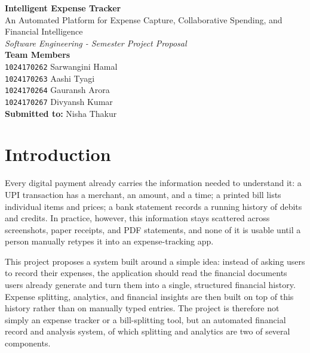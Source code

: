 \documentclass[11pt,a4paper]{article}
\begin{document}

\begin{center}

    {\huge\bfseries
    Intelligent Expense Tracker}\\[0.5em]

    {\large
    An Automated Platform for Expense Capture, Collaborative Spending,
    and Financial Intelligence}
    \\[0.9em]

    {\normalsize\itshape
    Software Engineering - Semester Project Proposal}\\[0.8em]

    {\small\bfseries Team Members}\\[0.3em]

    {\small
    \texttt{1024170262} Sarwangini Hamal\\
    \texttt{1024170263} Aashi Tyagi\\
    \texttt{1024170264} Gauransh Arora\\
    \texttt{1024170267} Divyansh Kumar%
    }\\[0.5em]

    {\small\textbf{Submitted to:} Nisha Thakur}

\end{center}

\vspace{0.8em}


\section{Introduction}

Every digital payment already carries the information needed to
understand it: a UPI transaction has a merchant, an amount, and a time;
a printed bill lists individual items and prices; a bank statement
records a running history of debits and credits. In practice, however,
this information stays scattered across screenshots, paper receipts, and
PDF statements, and none of it is usable until a person manually
retypes it into an expense-tracking app.

This project proposes a system built around a simple idea: instead of
asking users to record their expenses, the application should read the
financial documents users already generate and turn them into a single,
structured financial history. Expense splitting, analytics, and
financial insights are then built on top of this history rather than on
manually typed entries. The project is therefore not simply an expense
tracker or a bill-splitting tool, but an automated financial record
and analysis system, of which splitting and analytics are two of
several components.
\end{document}
